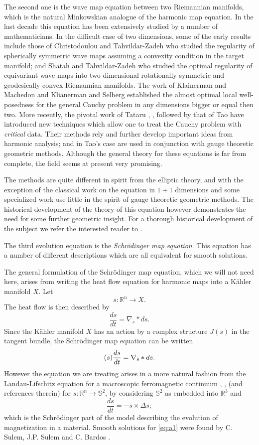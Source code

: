 \documentclass[draft,11pt,leqno]{amsart}
\newcommand{\De}{\Delta}
\newcommand{\rn}{{\mathbb R}^n}
\newcommand{\rthree}{\mathbb R^3}
\newcommand{\stwo}{\mathbb S^2}
\newcommand{\f}{\displaystyle\frac}
\begin{document}
The second one is the wave map equation between two Riemannian
manifolds, which  is the natural
Minkowskian analogue of the harmonic map equation. In the last decade
this equation has been extensively studied by a number of
mathematicians. In the difficult case of two dimensions, some of  
the early results include those of Christodoulou and
Tahvildar-Zadeh \cite{Christo} who
studied the regularity of spherically symmetric wave
maps assuming a convexity condition in the target manifold; and   
Shatah and Tahvildar-Zadeh \cite{Sha1} \cite{Sha2} who studied the 
optimal regularity of equivariant wave maps into two-dimensional
rotationally symmetric and geodesically convex Riemannian manifolds.
The work of Klainerman and Machedon \cite{KlM} \cite{KlM1} \cite{KlM2}
and Klianerman and Selberg \cite{KlS}
established the almost optimal local well-posedness 
for the general Cauchy problem in any dimensions bigger or equal then two. 
More recently, the pivotal work of Tataru \cite{Tat1}, \cite{Tat2}, 
followed by that of Tao \cite{Tao1} \cite{Tao2} 
have introduced new techniques which allow one to treat the Cauchy problem with {\it critical} data. Their methods rely 
and further develop important ideas from harmonic analysis; and in Tao's case 
are used in conjunction with gauge theoretic geometric methods.  Although the
general theory for these equations is far from complete, the field
seems at present very promising.

The methods are quite different in spirit 
from the elliptic theory, and with the exception of the  classical 
work on the equation in $1+1$ dimensions and some specialized work
use little in the spirit of gauge theoretic geometric methods.
The historical development of the theory of this equation however 
demonstrates the need for some further geometric insight.
For a thorough historical development of the subject we 
refer the interested reader to \cite{Shatah}. 

The third evolution equation is the {\it Schr\"odinger map equation}. This equation has a number of 
different descriptions which are all equivalent for smooth solutions. 

The general formulation of the Schr\"odinger map equation, which we will 
not need here, arises from  writing the heat flow equation  for 
harmonic maps into a K\"ahler manifold $X$. Let 
$$
s:\rn\to X.
$$
The heat flow is then described by 
$$
\f{ds}{dt}= \nabla_s*ds.
$$
Since the K\"ahler manifold $X$ has an action by a complex structure
$J(s)$ in the tangent bundle, the Schr\"odinger map equation can be written
$$\label   J(s)\f{ds}{dt}=\nabla_s*ds.
$$
However the equation we are treating arises in a more natural fashion from
the Landau-Lifschitz equation for a macroscopic ferromagnetic continuum 
\cite{Landau}, \cite{Sulem}, \cite{Papa} (and references therein) for $s:\rn\to\stwo$, by considering $\stwo$ as embedded into 
$\rthree$ and
\begin{equation}
\label{eq:a1}
\f{ds}{dt}=-s \times \De s ; 
\end{equation}
which is the Schr\"odinger part of the model describing the evolution of magnetization in a material. Smooth solutions for \eqref{eq:a1} were found 
by  C. Sulem, J.P. Sulem and C. Bardos \cite{Sulem}.  
\end{document}

